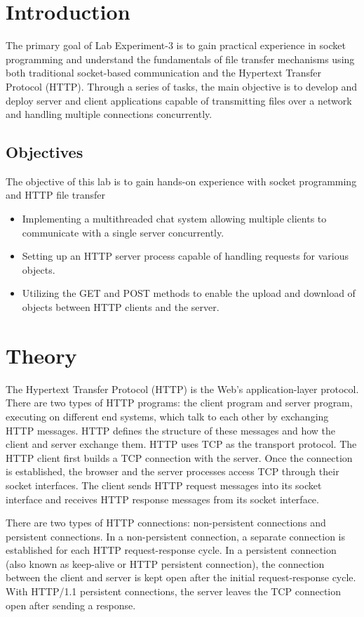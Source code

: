 \documentclass[11pt]{article}
\begin{document}
\section{Introduction}
The primary goal of Lab Experiment-3 is to gain practical experience in socket programming and understand the fundamentals of file transfer mechanisms using both traditional socket-based communication and the Hypertext Transfer Protocol (HTTP). Through a series of tasks, the main objective is to develop and deploy server and client applications capable of transmitting files over a network and handling multiple connections concurrently.

\subsection{Objectives}
The objective of this lab is to gain hands-on experience with socket programming and HTTP file transfer
\begin{itemize}
    \item Implementing a multithreaded chat system allowing multiple clients to communicate with a single server concurrently.
    \item Setting up an HTTP server process capable of handling requests for various objects.
    \item Utilizing the GET and POST methods to enable the upload and download of objects between HTTP clients and the server.
\end{itemize}

\section{Theory}

The Hypertext Transfer Protocol (HTTP) is the Web’s application-layer protocol. There are two types of HTTP programs: the client program and server program, executing on different end systems, which talk to each other by exchanging HTTP messages. HTTP defines the structure of these messages and how the client and server exchange them. HTTP uses TCP as the transport protocol. The HTTP client first builds a TCP connection with the server. Once the connection is established, the browser and the server processes access TCP through their socket interfaces. The client sends HTTP request messages into its socket interface and receives HTTP response messages from its socket interface.


There are two types of HTTP connections: non-persistent connections and persistent connections. In a non-persistent connection, a separate connection is established for each HTTP request-response cycle. In a persistent connection (also known as keep-alive or HTTP persistent connection), the connection between the client and server is kept open after the initial request-response cycle. With HTTP/1.1 persistent connections, the server leaves the TCP connection open after sending a response.
\end{document}
